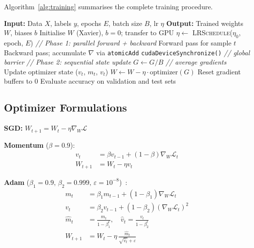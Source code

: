 \documentclass[runningheads]{llncs}
\begin{document}
Algorithm~\ref{alg:training} summarises the complete training procedure.

\begin{algorithm}[htb]
\caption{CUDAnet Training with 2PGA}
\label{alg:training}
\begin{algorithmic}[1]
\STATE \textbf{Input:} Data $X$, labels $y$, epochs $E$, batch size $B$, lr $\eta$
\STATE \textbf{Output:} Trained weights $W$, biases $b$
\STATE Initialise $W$ (Xavier), $b=0$; transfer to GPU
    \STATE $\eta \leftarrow$ \textsc{LRSchedule}($\eta_0$, epoch, $E$)
        \STATE \textit{// Phase 1: parallel forward + backward}
            \STATE Forward pass for sample $t$
            \STATE Backward pass; accumulate $\nabla$ via \texttt{atomicAdd}
        \ENDFOR
        \STATE \texttt{cudaDeviceSynchronize()} \quad\textit{// global barrier}
        \STATE \textit{// Phase 2: sequential state update}
        \STATE $G \leftarrow G / B$ \quad\textit{// average gradients}
        \STATE Update optimizer state ($v_t$, $m_t$, $v_t$)
        \STATE $W \leftarrow W - \eta \cdot \text{optimizer}(G)$
        \STATE Reset gradient buffers to 0
    \ENDFOR
    \STATE Evaluate accuracy on validation and test sets
\ENDFOR
\end{algorithmic}
\end{algorithm}

\subsection{Optimizer Formulations}

\textbf{SGD:} $W_{t+1} = W_t - \eta \nabla_W \mathcal{L}$

\noindent\textbf{Momentum} ($\beta=0.9$):
\begin{align}
  v_t     &= \beta v_{t-1} + (1-\beta)\nabla_W \mathcal{L}_t \\
  W_{t+1} &= W_t - \eta v_t
\end{align}

\noindent\textbf{Adam} ($\beta_1=0.9,\,\beta_2=0.999,\,\varepsilon=10^{-8}$)~\cite{b7}:
\begin{align}
  m_t       &= \beta_1 m_{t-1} + (1-\beta_1)\nabla_W \mathcal{L}_t \\
  v_t       &= \beta_2 v_{t-1} + (1-\beta_2)(\nabla_W \mathcal{L}_t)^2 \\
  \hat{m}_t &= \frac{m_t}{1-\beta_1^t},\quad
  \hat{v}_t  = \frac{v_t}{1-\beta_2^t} \\
  W_{t+1}   &= W_t - \eta\,\frac{\hat{m}_t}{\sqrt{\hat{v}_t}+\varepsilon}
\end{align}
\end{document}
